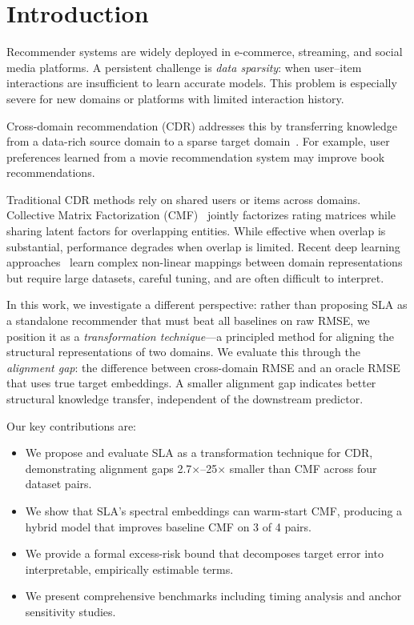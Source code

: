 \documentclass[conference]{IEEEtran}
\begin{document}
\section{Introduction}

Recommender systems are widely deployed in e-commerce, streaming, and social media platforms. A persistent challenge is \emph{data sparsity}: when user--item interactions are insufficient to learn accurate models. This problem is especially severe for new domains or platforms with limited interaction history.

Cross-domain recommendation (CDR) addresses this by transferring knowledge from a data-rich source domain to a sparse target domain~\cite{cantador2015}. For example, user preferences learned from a movie recommendation system may improve book recommendations.

Traditional CDR methods rely on shared users or items across domains. Collective Matrix Factorization (CMF)~\cite{singh2008} jointly factorizes rating matrices while sharing latent factors for overlapping entities. While effective when overlap is substantial, performance degrades when overlap is limited. Recent deep learning approaches~\cite{yuan2019, man2017, hu2018} learn complex non-linear mappings between domain representations but require large datasets, careful tuning, and are often difficult to interpret.

In this work, we investigate a different perspective: rather than proposing SLA as a standalone recommender that must beat all baselines on raw RMSE, we position it as a \emph{transformation technique}---a principled method for aligning the structural representations of two domains. We evaluate this through the \emph{alignment gap}: the difference between cross-domain RMSE and an oracle RMSE that uses true target embeddings. A smaller alignment gap indicates better structural knowledge transfer, independent of the downstream predictor.

Our key contributions are:
\begin{itemize}
    \item We propose and evaluate SLA as a transformation technique for CDR, demonstrating alignment gaps 2.7$\times$--25$\times$ smaller than CMF across four dataset pairs.
    \item We show that SLA's spectral embeddings can warm-start CMF, producing a hybrid model that improves baseline CMF on 3 of 4 pairs.
    \item We provide a formal excess-risk bound that decomposes target error into interpretable, empirically estimable terms.
    \item We present comprehensive benchmarks including timing analysis and anchor sensitivity studies.
\end{itemize}
\end{document}
